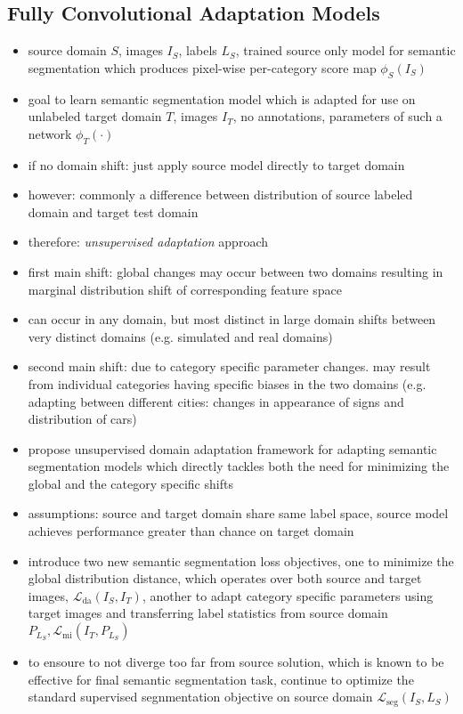 \subsection{Fully Convolutional Adaptation Models}
\begin{itemize}
	\item source domain $S$, images $I_S$, labels $L_S$, trained source only model for semantic segmentation which produces pixel-wise per-category score map $\phi_S(I_S)$
	\item goal to learn semantic segmentation model which is adapted for use on unlabeled target domain $T$, images $I_T$, no annotations, parameters of such a network $\phi_T(\cdot)$
	\item if no domain shift: just apply source model directly to target domain
	\item however: commonly a difference between distribution of source labeled domain and target test domain
	\item therefore: \textit{unsupervised adaptation} approach
	\item first main shift: global changes may occur between two domains resulting in marginal distribution shift of corresponding feature space
	\item can occur in any domain, but most distinct in large domain shifts between very distinct domains (e.g. simulated and real domains)
	\item second main shift: due to category specific parameter changes. may result from individual categories having specific biases in the two domains (e.g. adapting between different cities: changes in appearance of signs and distribution of cars)
	\item propose unsupervised domain adaptation framework for adapting semantic segmentation models which directly tackles both the need for minimizing the global and the category specific shifts
	\item assumptions: source and target domain share same label space, source model achieves performance greater than chance on target domain
	\item introduce two new semantic segmentation loss objectives, one to minimize the global distribution distance, which operates over both source and target images, $\mathcal{L}_{\text{da}}(I_S, I_T)$, another to adapt category specific parameters using target images and transferring label statistics from source domain $P_{L_S}, \mathcal{L}_{\text{mi}}(I_T,P_{L_S})$
	\item to ensoure to not diverge too far from source solution, which is known to be effective for final semantic segmentation task, continue to optimize the standard supervised segnmentation objective on source domain $\mathcal{L}_{\text{seg}}(I_S, L_S)$

\end{itemize}
